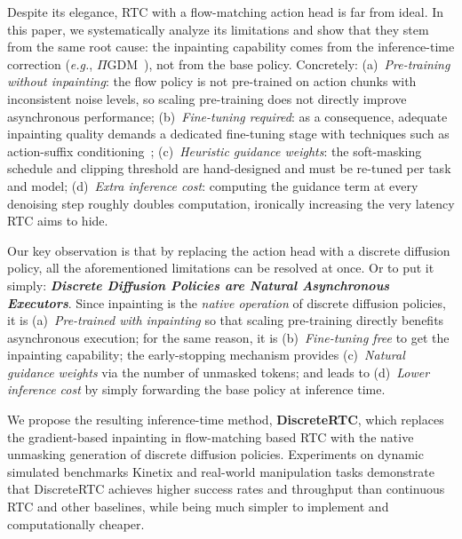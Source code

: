 \documentclass{article}
\newcommand{\eg}{\textit{e.g.}}
\begin{document}
Despite its elegance, RTC with a flow-matching action head is far from ideal.
In this paper, we systematically analyze its limitations and show that they stem from the same root cause: the inpainting capability comes from the inference-time correction (\eg, $\Pi$GDM~\citep{song2023pseudoinverse}), not from the base policy.
Concretely:
(a)~\emph{Pre-training without inpainting}: the flow policy is not pre-trained on action chunks with inconsistent noise levels, so scaling pre-training does not directly improve asynchronous performance;
(b)~\emph{Fine-tuning required}: as a consequence, adequate inpainting quality demands a dedicated fine-tuning stage with techniques such as action-suffix conditioning~\citep{black2025training, wang2026real};
(c)~\emph{Heuristic guidance weights}: the soft-masking schedule and clipping threshold are hand-designed and must be re-tuned per task and model;
(d)~\emph{Extra inference cost}: computing the guidance term at every denoising step roughly doubles computation, ironically increasing the very latency RTC aims to hide.



Our key observation is that by replacing the action head with a discrete diffusion policy, all the aforementioned limitations can be resolved at once. Or to put it simply: \emph{\textbf{Discrete Diffusion Policies are Natural Asynchronous Executors}}.
Since inpainting is the \emph{native operation} of discrete diffusion policies,
it is (a)~\emph{Pre-trained with inpainting} so that scaling pre-training directly benefits asynchronous execution;
for the same reason, it is (b)~\emph{Fine-tuning free} to get the inpainting capability;
the early-stopping mechanism provides (c)~\emph{Natural guidance weights} via the number of unmasked tokens;
and leads to (d)~\emph{Lower inference cost} by simply forwarding the base policy at inference time.


We propose the resulting inference-time method, \textbf{DiscreteRTC}, which replaces the gradient-based inpainting in flow-matching based RTC with the native unmasking generation of discrete diffusion policies.
Experiments on dynamic simulated benchmarks Kinetix and real-world manipulation tasks demonstrate that DiscreteRTC achieves higher success rates and throughput than continuous RTC and other baselines, while being much simpler to implement and computationally cheaper.
\end{document}
